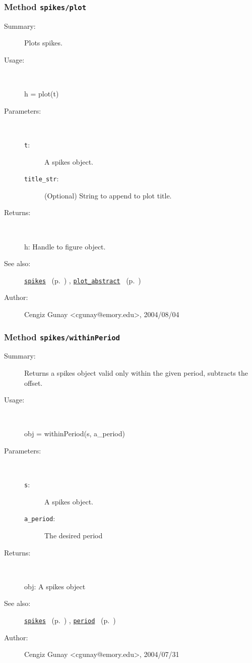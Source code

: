\subsubsection[Method \texttt{plot}]{Method \texttt{spikes/plot}}%
%
\label{ref_spikes__plot}%
\hypertarget{ref_spikes__plot}{}%
\begin{description}
\item[Summary:]Plots spikes.
%
\item[Usage:]~%
\begin{lyxcode}%
h = plot(t)
%
\end{lyxcode}%
%
%
\item[Parameters:]~
\begin{description}%
\item[\texttt{t}:]
 A spikes object.
\item[\texttt{title\_str}:]
 (Optional) String to append to plot title.
\end{description}%
%
\item[Returns:]~

	h: Handle to figure object.
%
%
\item[See also:]%
\hyperlink{ref_spikes}{\texttt{spikes}}%
\ (p.~\pageref{ref_spikes})%
%
, \hyperlink{ref_plot_abstract}{\texttt{plot\_abstract}}%
\ (p.~\pageref{ref_plot_abstract})%
%
%
\item[Author:]%
Cengiz Gunay <cgunay@emory.edu>, 2004/08/04%
\end{description}
\methodline%
\subsubsection[Method \texttt{withinPeriod}]{Method \texttt{spikes/withinPeriod}}%
%
\label{ref_spikes__withinPeriod}%
\hypertarget{ref_spikes__withinPeriod}{}%
\begin{description}
\item[Summary:]Returns a spikes object valid only within the given period, subtracts the offset.
%
\item[Usage:]~%
\begin{lyxcode}%
obj = withinPeriod(s, a\_period)
%
\end{lyxcode}%
%
%
\item[Parameters:]~
\begin{description}%
\item[\texttt{s}:]
 A spikes object.
\item[\texttt{a\_period}:]
 The desired period 
\end{description}%
%
\item[Returns:]~

	obj: A spikes object
%
%
\item[See also:]%
\hyperlink{ref_spikes}{\texttt{spikes}}%
\ (p.~\pageref{ref_spikes})%
%
, \hyperlink{ref_period}{\texttt{period}}%
\ (p.~\pageref{ref_period})%
%
%
\item[Author:]%
Cengiz Gunay <cgunay@emory.edu>, 2004/07/31%
\end{description}
\methodline%
